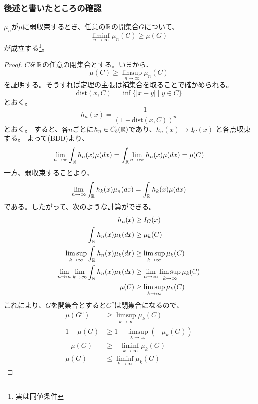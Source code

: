     \subsubsection{後述と書いたところの確認}
      \begin{lem*}
        $\mu_n$が$\mu$に弱収束するとき、任意の${\mathbb{R}}$の開集合$G$について、
        \[
          \liminf_{n \to \infty}\mu_n(G) \ge \mu(G)
        \]
        が成立する\footnote{実は同値条件}。
      \end{lem*}
      \begin{proof}
        $C$を${\mathbb{R}}$の任意の閉集合とする。いまから、
        \[
          \mu(C) \ge \limsup_{n \to \infty}\mu_n(C)
        \]
        を証明する。そうすれば定理の主張は補集合を取ることで確かめられる。
        \[
          \text{dist}(x,C) = \inf\{|x - y| \mid y \in C\}
        \]
        とおく。
        \[
          h_n(x) = \frac{1}{( 1 + \text{dist}(x,C) )^n}
        \]
        とおく。
        すると、各$n$ごとに$h_n \in C_b({\mathbb{R}})$であり、$h_n(x) \longrightarrow I_C(x)$
        と各点収束する。
        よって(BDD)より、
        \[
          \lim_{n \to \infty}\int_{{\mathbb{R}}}h_n(x) \mu(dx) = \int_{{\mathbb{R}}} \lim_{n \to \infty}h_n(x) \mu(dx) = \mu(C)
        \]
        一方、弱収束することより、
        \[
          \lim_{n \to \infty}\int_{{\mathbb{R}}}h_k(x) \mu_n(dx) = \int_{{\mathbb{R}}}h_k(x) \mu(dx)
        \]
        である。したがって、次のような計算ができる。
        \begin{align*}
          h_n(x) &\ge I_C(x)\\
          \int_{{\mathbb{R}}} h_n(x) \mu_k(dx) &\ge \mu_k(C)\\
          \limsup_{k \to \infty}\int_{{\mathbb{R}}} h_n(x) \mu_k(dx) &\ge \limsup_{k \to \infty}\mu_k(C)\\
          \lim_{n \to \infty}\lim_{k \to \infty}\int_{{\mathbb{R}}} h_n(x) \mu_k(dx) &\ge \lim_{n \to \infty}\limsup_{k \to \infty}\mu_k(C)\\
          \mu(C) &\ge \limsup_{k \to \infty}\mu_k(C)
        \end{align*}
        これにより、$G$を開集合とすると$G^c$は閉集合になるので、
        \begin{align*}
          \mu(G^c) &\ge \limsup_{k \to \infty}\mu_k(C)\\
          1 - \mu(G) &\ge 1 + \limsup_{k \to \infty}(- \mu_k(G))\\
          -\mu(G) &\ge -\liminf_{k \to \infty}\mu_k(G)\\
          \mu(G) &\leq \liminf_{k \to \infty}\mu_k(G)
        \end{align*}
      \end{proof}

